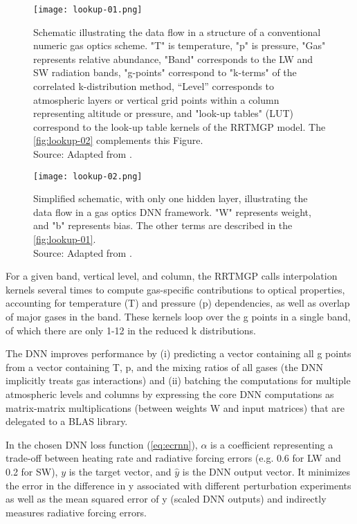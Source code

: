 \begin{figure}[htb]\centering
\texttt{[image: lookup-01.png]}
\caption{Schematic illustrating the data flow in a structure of a conventional numeric gas optics scheme. "T" is temperature, "p" is pressure, "Gas" represents relative abundance, "Band" corresponds to the LW and SW radiation bands, "g-points" correspond to "k-terms" of the correlated k-distribution method, “Level” corresponds to atmospheric layers or vertical grid points within a column representing altitude or pressure, and "look-up tables" (LUT) correspond to the look-up table kernels of the RRTMGP model. The \autoref{fig:lookup-02} complements this Figure.\\
Source: Adapted from .}
\label{fig:lookup-01}
\end{figure}

\begin{figure}[htb]\centering
\texttt{[image: lookup-02.png]}
\caption{Simplified schematic, with only one hidden layer, illustrating the data flow in a gas optics DNN framework. "W" represents weight, and "b" represents bias. The other terms are described in the \autoref{fig:lookup-01}.\\
Source: Adapted from .}
\label{fig:lookup-02}
\end{figure}

For a given band, vertical level, and column, the RRTMGP calls interpolation kernels several times to compute gas-specific contributions to optical properties, accounting for temperature (T) and pressure (p) dependencies, as well as overlap of major gases in the band. These kernels loop over the g points in a single band, of which there are only 1-12 in the reduced k distributions.

The DNN improves performance by (i) predicting a vector containing all g points from a vector containing T, p, and the mixing ratios of all gases (the DNN implicitly treats gas interactions) and (ii) batching the computations for multiple atmospheric levels and columns by expressing the core DNN computations as matrix-matrix multiplications (between weights W and input matrices) that are delegated to a BLAS library. 

In the chosen DNN loss function (\autoref{eq:ecrnn}), $\alpha$ is a coefficient representing a trade-off between heating rate and radiative forcing errors (e.g. 0.6 for LW and 0.2 for SW), $y$ is the target vector, and $\hat{y}$ is the DNN output vector. It minimizes the error in the difference in y associated with different perturbation experiments as well as the mean squared error of y (scaled DNN outputs) and indirectly measures radiative forcing errors.

